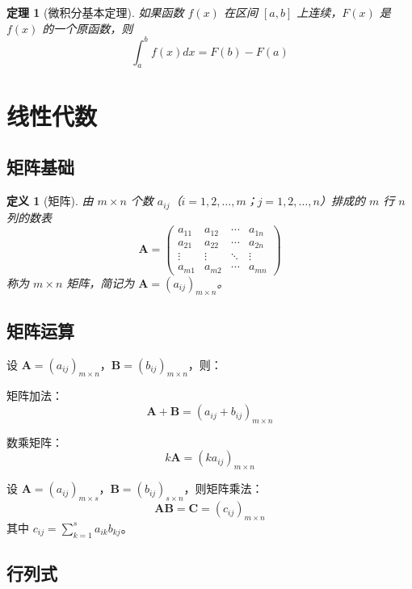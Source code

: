 \documentclass[12pt]{article}
\newtheorem{theorem}{定理}
\newtheorem{definition}{定义}
\begin{document}
\begin{theorem}[微积分基本定理]
如果函数 $f(x)$ 在区间 $[a, b]$ 上连续，$F(x)$ 是 $f(x)$ 的一个原函数，则
$$\int_a^b f(x) dx = F(b) - F(a)$$
\end{theorem}


\section{线性代数}

\subsection{矩阵基础}

\begin{definition}[矩阵]
由 $m \times n$ 个数 $a_{ij}$（$i = 1, 2, \ldots, m$；$j = 1, 2, \ldots, n$）排成的 $m$ 行 $n$ 列的数表
$$\mathbf{A} = \begin{pmatrix}
a_{11} & a_{12} & \cdots & a_{1n} \\
a_{21} & a_{22} & \cdots & a_{2n} \\
\vdots & \vdots & \ddots & \vdots \\
a_{m1} & a_{m2} & \cdots & a_{mn}
\end{pmatrix}$$
称为 $m \times n$ 矩阵，简记为 $\mathbf{A} = (a_{ij})_{m \times n}$。
\end{definition}

\subsection{矩阵运算}

设 $\mathbf{A} = (a_{ij})_{m \times n}$，$\mathbf{B} = (b_{ij})_{m \times n}$，则：

矩阵加法：
$$\mathbf{A} + \mathbf{B} = (a_{ij} + b_{ij})_{m \times n}$$

数乘矩阵：
$$k\mathbf{A} = (ka_{ij})_{m \times n}$$

设 $\mathbf{A} = (a_{ij})_{m \times s}$，$\mathbf{B} = (b_{ij})_{s \times n}$，则矩阵乘法：
$$\mathbf{AB} = \mathbf{C} = (c_{ij})_{m \times n}$$
其中 $c_{ij} = \sum_{k=1}^{s} a_{ik} b_{kj}$。

\subsection{行列式}
\end{document}
